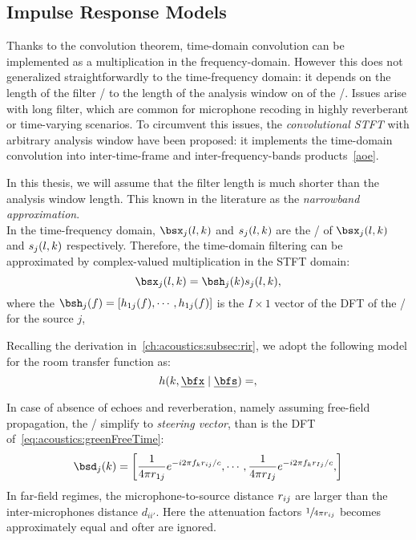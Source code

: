 \subsection{Impulse Response Models}
Thanks to the convolution theorem, time-domain convolution can be implemented as a multiplication in the frequency-domain.
However this does not generalized straightforwardly to the time-frequency domain:
it depends on the length of the filter \wrt/ to the length of the analysis window on of the \STFT/.
Issues arise with long filter, which are common for microphone recoding in highly reverberant or time-varying scenarios.
To circumvent this issues, the \textit{convolutional STFT} with arbitrary analysis window have been proposed:
it implements the time-domain convolution into inter-time-frame and inter-frequency-bands products~\cref{aoe}.

In this thesis, we will assume that the filter length is much shorter than the analysis window length.
This known in the literature as the \textit{narrowband approximation}\cite{}.
\\In the time-frequency domain, $\mics_j(l,k)$  and $s_j(l,k)$ are the \STFT/ of $\mics_j(l,k)$ and $s_j(l,k)$ respectively.
Therefore, the time-domain filtering can be approximated by complex-valued multiplication in the STFT domain:
\begin{equation}
    \mics_j(l,k) = \bsh_j(k) \src_j(l,k)
    ,
\end{equation}
where the $\bsh_j(f) = \klist{h_{1j}(f), \cdots, h_{1j}(f)}$ is the $I \times 1$ vector of the DFT of the
\RIRs/ for the source $j$,

Recalling the derivation in~\cref{ch:acoustics:subsec:rir}, we adopt the following model for the room transfer function as:
\begin{equation}
    \rir (k, \positionMicrophone \mid \positionSource) =
    ,
\end{equation}

In case of absence of echoes and reverberation, namely assuming free-field propagation,
the \RIRs/ simplify to \textit{steering vector}, than is the DFT of~\cref{eq:acoustics:greenFreeTime}:
\begin{equation}\label{eq:processing:steering}
    \bsd_{j}(k) = \klist{\frac{1}{4 \pi \distMicSrc_{1j}} \cste^{-\csti 2 \pi f_k \distMicSrc_{ij} / c},
                            \cdots,
                            \frac{1}{4 \pi \distMicSrc_{Ij}} \cste^{-\csti 2 \pi f_k \distMicSrc_{Ij} / c},
                    }
\end{equation}
In far-field regimes, the microphone-to-source distance $r_{ij}$ are larger than the
inter-microphones distance $d_{ii'}$. Here the attenuation factors $\sfrac{1}{4 \pi r_{ij}}$ becomes approximately equal
and ofter are ignored.


